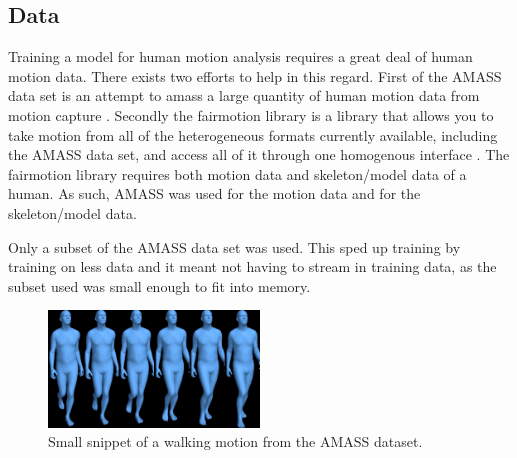 \subsection{Data}\label{subsec:data}
Training a model for human motion analysis requires a great deal of human motion data. There exists two efforts to help in this regard. First of the AMASS data set is an attempt to amass a large quantity of human motion data from motion capture \cite{AMASS:2019}. Secondly the fairmotion library is a library that allows you to take motion from all of the heterogeneous formats currently available, including the AMASS data set, and access all of it through one homogenous interface \cite{gopinath2020fairmotion}. The fairmotion library requires both motion data and skeleton/model data of a human. As such, AMASS was used for the motion data and \cite{MANO:2017} for the skeleton/model data.

Only a subset of the AMASS data set was used. This sped up training by training on less data and it meant not having to stream in training data, as the subset used was small enough to fit into memory.

\begin{figure}[h]
\centering
\includegraphics[width=0.5\textwidth]{img/02_01}
\caption{Small snippet of a walking motion from the AMASS dataset.}
\label{fig:walking}
\end{figure}


